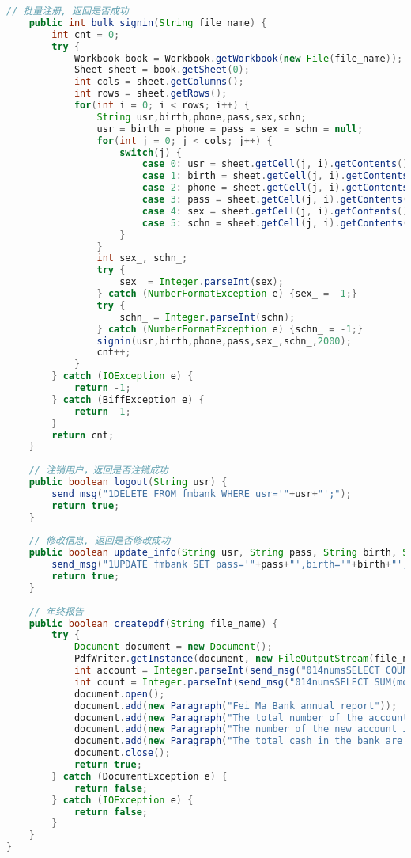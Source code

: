 \begin{lstlisting}[language = java, caption = Worker.java]
	// 批量注册, 返回是否成功
	public int bulk_signin(String file_name) {
		int cnt = 0;
		try {
			Workbook book = Workbook.getWorkbook(new File(file_name));
			Sheet sheet = book.getSheet(0);
			int cols = sheet.getColumns();
			int rows = sheet.getRows();
			for(int i = 0; i < rows; i++) {
				String usr,birth,phone,pass,sex,schn;
				usr = birth = phone = pass = sex = schn = null;
				for(int j = 0; j < cols; j++) {
					switch(j) {
						case 0: usr = sheet.getCell(j, i).getContents(); break;
						case 1: birth = sheet.getCell(j, i).getContents(); break;
						case 2: phone = sheet.getCell(j, i).getContents(); break;
						case 3: pass = sheet.getCell(j, i).getContents(); break;
						case 4: sex = sheet.getCell(j, i).getContents(); break;
						case 5: schn = sheet.getCell(j, i).getContents(); break;
					}
				}
				int sex_, schn_;
				try {
					sex_ = Integer.parseInt(sex);
				} catch (NumberFormatException e) {sex_ = -1;}
				try {
					schn_ = Integer.parseInt(schn);
				} catch (NumberFormatException e) {schn_ = -1;}
				signin(usr,birth,phone,pass,sex_,schn_,2000);
				cnt++;
			}
		} catch (IOException e) {
			return -1;
		} catch (BiffException e) {
			return -1;
		}
		return cnt;
	}
	
	// 注销用户，返回是否注销成功
	public boolean logout(String usr) {
		send_msg("1DELETE FROM fmbank WHERE usr='"+usr+"';");
		return true;
	}
	
	// 修改信息, 返回是否修改成功
	public boolean update_info(String usr, String pass, String birth, String phone) {
		send_msg("1UPDATE fmbank SET pass='"+pass+"',birth='"+birth+"',phone='"+phone+"' WHERE usr='"+usr+"';");
		return true;
	}
	
	// 年终报告
	public boolean createpdf(String file_name) {
		try {
			Document document = new Document();
			PdfWriter.getInstance(document, new FileOutputStream(file_name));
			int account = Integer.parseInt(send_msg("014numsSELECT COUNT(*) AS nums FROM fmbank;"));
			int count = Integer.parseInt(send_msg("014numsSELECT SUM(money) AS nums FROM fmbank;"));
			document.open();
			document.add(new Paragraph("Fei Ma Bank annual report"));
			document.add(new Paragraph("The total number of the account is: "+account));
			document.add(new Paragraph("The number of the new account is: "+account));
			document.add(new Paragraph("The total cash in the bank are: "+count));
			document.close();
			return true;
		} catch (DocumentException e) {
			return false;
		} catch (IOException e) {
			return false;
		}
	}
}
\end{lstlisting}
\newpage
